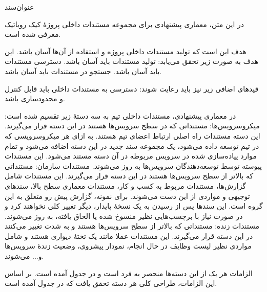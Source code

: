 \documentclass{cake-classes/short-report-fa}
\begin{document}
‌عنوان‌سند

در این متن، معماری پیشنهادی برای مجموعه مستندات داخلی پروژهٔ کیک روباتیک معرفی شده است.

هدف این است که تولید مستندات داخلی پروژه و استفاده از آن‌ها آسان باشد.
این هدف به صورت زیر تحقق می‌یابد:
 تولید مستندات باید آسان باشد.
 دسترسی مستندات باید آسان باشد.
 جستجو در مستندات باید آسان باشد.

قیدهای اضافی زیر نیز باید رعایت شوند:
 دسترسی به مستندات داخلی باید قابل کنترل و محدودسازی باشد.

در معماری پیشنهادی، مستندات داخلی تیم به سه دستهٔ زیر تقسیم شده است:
  میکروسرویس‌ها:
مستنداتی که در سطح سرویس‌ها هستند در این دسته قرار می‌گیرند.
این دسته مستندات راه اصلی ارتباط اعضای تیم هستند.
به ازای هر میکروسرویسی که در تیم توسعه داده می‌شود، یک مجموعه سند جدید در این دسته اضافه می‌شود و تمام موارد پیاده‌سازی شده در سرویس مربوطه در آن دسته مستند می‌شود.
این مستندات پیوسته توسط توسعه‌دهندگان سرویس‌ها به روز می‌شوند.
 مستندات سازمان:
مستنداتی که بالاتر از سطح سرویس‌ها هستند در این دسته قرار می‌گیرند.
این مستندات شامل گزارش‌ها، مستندات مربوط به کسب و کار، مستندات معماری سطح بالا، سندهای توجیهی و مواردی از این دست می‌شوند.
برای نمونه، گزارش پیش رو متعلق به این گروه است.
این سندها پس از رسیدن به یک نسخهٔ پایدار، دیگر تغییر کلی نخواهند کرد و در صورت نیاز با برچسب‌هایی نظیر منسوخ شده یا الحاق یافته، به روز می‌شوند.
 مستندات زنده:
مستنداتی که بالاتر از سطح سرویس‌ها هستند و به شدت تغییر می‌کنند در این دسته قرار می‌گیرند.
این مستندات عملا مانند یک تختهٔ دیواری هستند و شامل مواردی نظیر لیست وظایف در حال انجام، نمودار پیشروی، وضعیت زندهٔ سرویس‌ها و... می‌شوند.

الزامات هر یک از این دسته‌ها منحصر به فرد است و در جدول  آمده است. بر اساس این الزامات، طراحی کلی هر دسته تحقق یافت که در جدول  آمده است.
\end{document}
